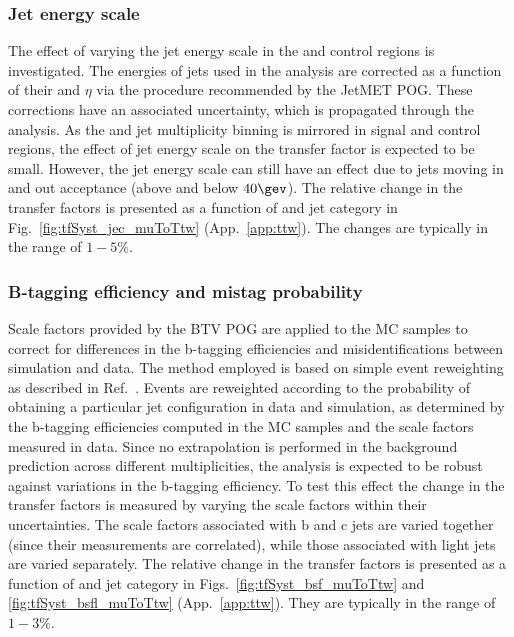 \subsubsection{Jet energy scale}
\label{sec:tfSyst_jec}

The effect of varying the jet energy scale in the \mj and \mmj control
regions is investigated.  The energies of jets used in the analysis
are corrected as a function of their \pt and $\eta$ via the procedure
recommended by the JetMET POG. These corrections have an associated
uncertainty, which is propagated through the analysis.  As the \scalht
and jet multiplicity binning is mirrored in signal and control
regions, the effect of jet energy scale on the transfer factor is
expected to be small.  However, the jet energy scale can still have an
effect due to jets moving in and out acceptance (above and below
$40\gev$). The relative change in the transfer factors is presented as
a function of \scalht and jet category in
Fig.~\ref{fig:tfSyst_jec_muToTtw} (App.~\ref{app:ttw}). The changes
are typically in the range of $1-5\%$.

\subsubsection{B-tagging efficiency and mistag probability}
\label{sec:tfSyst_btag}

Scale factors provided by the BTV POG are applied to the MC samples to
correct for differences in the b-tagging efficiencies and
misidentifications between simulation and data.  The method employed
is based on simple event reweighting as described in
Ref.~\cite{btagSFMethods}.  Events are reweighted according to the
probability of obtaining a particular jet configuration in data and
simulation, as determined by the b-tagging efficiencies computed in
the MC samples and the scale factors measured in data.  Since no
extrapolation is performed in the background prediction across
different \nb multiplicities, the analysis is expected to be robust
against variations in the b-tagging efficiency.  To test this effect
the change in the transfer factors is measured by varying the scale
factors within their uncertainties. The scale factors associated with
b and c jets are varied together (since their measurements are
correlated), while those associated with light jets are varied
separately.  The relative change in the transfer factors is presented
as a function of \scalht and jet category in
Figs.~\ref{fig:tfSyst_bsf_muToTtw} and \ref{fig:tfSyst_bsfl_muToTtw}
(App.~\ref{app:ttw}).  They are typically in the range of $1-3\%$.

